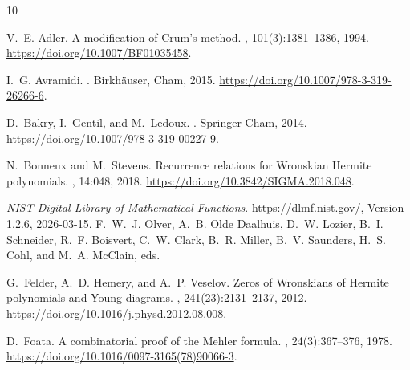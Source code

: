 \documentclass[12pt]{article}
\begin{document}
% 


%
%

\begin{thebibliography}{10}

V.~E. Adler.
\newblock A modification of {Crum}'s method.
, 101(3):1381--1386, 1994.
\newblock \url{https://doi.org/10.1007/BF01035458}.

I.~G. Avramidi.
.
\newblock Birkh{\"a}user, Cham, 2015.
\newblock \url{https://doi.org/10.1007/978-3-319-26266-6}.

D.~Bakry, I.~Gentil, and M.~Ledoux.
.
\newblock Springer Cham, 2014.
\newblock \url{https://doi.org/10.1007/978-3-319-00227-9}.

N.~Bonneux and M.~Stevens.
\newblock Recurrence relations for {Wronskian} {Hermite} polynomials.
, 14:048, 2018.
\newblock \url{https://doi.org/10.3842/SIGMA.2018.048}.

{\it NIST Digital Library of Mathematical Functions}.
\newblock \url{https://dlmf.nist.gov/}, Version 1.2.6, 2026-03-15.
\newblock F.~W.~J. Olver, A.~B. {Olde Daalhuis}, D.~W. Lozier, B.~I. Schneider,
  R.~F. Boisvert, C.~W. Clark, B.~R. Miller, B.~V. Saunders, H.~S. Cohl, and
  M.~A. McClain, eds.

G.~Felder, A.~D. Hemery, and A.~P. Veselov.
\newblock Zeros of {Wronskians} of {Hermite} polynomials and {Young} diagrams.
, 241(23):2131--2137, 2012.
\newblock \url{https://doi.org/10.1016/j.physd.2012.08.008}.

D.~Foata.
\newblock A combinatorial proof of the {Mehler} formula.
, 24(3):367--376,
  1978.
\newblock \url{https://doi.org/10.1016/0097-3165(78)90066-3}.


\end{thebibliography}
\end{document}
